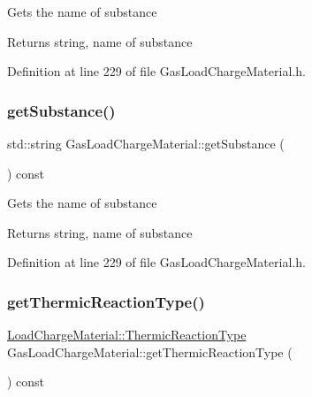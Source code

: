 Gets the name of substance \begin{DoxyReturn}{Returns}
string, name of substance 
\end{DoxyReturn}


Definition at line 229 of file Gas\+Load\+Charge\+Material.\+h.

\mbox{\label{class_gas_load_charge_material_a5f967841f196f6b0b35f32f9610092e3}} 
\subsubsection{\texorpdfstring{get\+Substance()}{getSubstance()}\hspace{0.1cm}{\footnotesize\ttfamily [3/3]}}
{\footnotesize\ttfamily std\+::string Gas\+Load\+Charge\+Material\+::get\+Substance (\begin{DoxyParamCaption}{ }\end{DoxyParamCaption}) const\hspace{0.3cm}{\ttfamily [inline]}}

Gets the name of substance \begin{DoxyReturn}{Returns}
string, name of substance 
\end{DoxyReturn}


Definition at line 229 of file Gas\+Load\+Charge\+Material.\+h.

\mbox{\label{class_gas_load_charge_material_ac801f30ccf58ce98fdb6b8cdb0a9767f}} 
\subsubsection{\texorpdfstring{get\+Thermic\+Reaction\+Type()}{getThermicReactionType()}\hspace{0.1cm}{\footnotesize\ttfamily [1/3]}}
{\footnotesize\ttfamily \hyperlink{namespace_load_charge_material_a51d4263e865a5d86236622dd3fe23fd1}{Load\+Charge\+Material\+::\+Thermic\+Reaction\+Type} Gas\+Load\+Charge\+Material\+::get\+Thermic\+Reaction\+Type (\begin{DoxyParamCaption}{ }\end{DoxyParamCaption}) const\hspace{0.3cm}{\ttfamily [inline]}}

